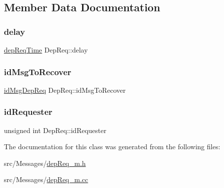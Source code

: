 \subsection{Member Data Documentation}
\mbox{\label{class_dep_req_a5df5ddeac692e25c089b458faf51e0c9}} 
\subsubsection{\texorpdfstring{delay}{delay}}
{\footnotesize\ttfamily \hyperlink{dep_req__m_8h_ae16a4057335e3a89fda3f6019868733b}{dep\+Req\+Time} Dep\+Req\+::delay\hspace{0.3cm}{\ttfamily [protected]}}

\mbox{\label{class_dep_req_a8547e169d4670212c0b612924dda94cc}} 
\subsubsection{\texorpdfstring{id\+Msg\+To\+Recover}{idMsgToRecover}}
{\footnotesize\ttfamily \hyperlink{dep_req__m_8h_a2bbb71ed0e9660ec02d81471eafd9c29}{id\+Msg\+Dep\+Req} Dep\+Req\+::id\+Msg\+To\+Recover\hspace{0.3cm}{\ttfamily [protected]}}

\mbox{\label{class_dep_req_a26936e95ef3fae4753d2442318646c6b}} 
\subsubsection{\texorpdfstring{id\+Requester}{idRequester}}
{\footnotesize\ttfamily unsigned int Dep\+Req\+::id\+Requester\hspace{0.3cm}{\ttfamily [protected]}}



The documentation for this class was generated from the following files\+:\begin{DoxyCompactItemize}
\item 
src/\+Messages/\hyperlink{dep_req__m_8h}{dep\+Req\+\_\+m.\+h}\item 
src/\+Messages/\hyperlink{dep_req__m_8cc}{dep\+Req\+\_\+m.\+cc}\end{DoxyCompactItemize}
